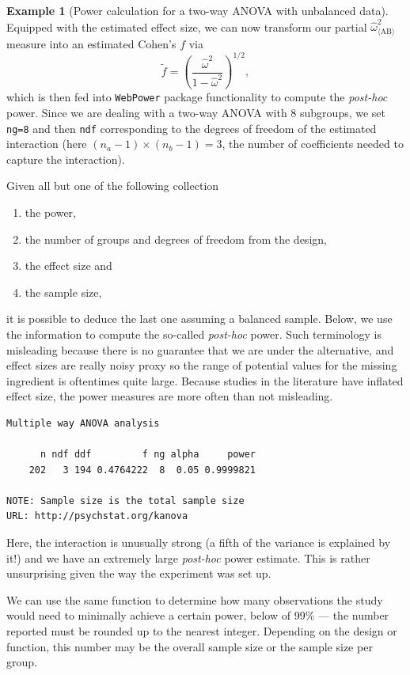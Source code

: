 \documentclass[
  11pt,
  letterpaper,
]{scrbook}
\providecommand{\tightlist}{%
  \setlength{\itemsep}{0pt}\setlength{\parskip}{0pt}}\usepackage{longtable,booktabs,array}
\theoremstyle{definition}
\theoremstyle{definition}
\newtheorem{example}{Example}[chapter]
\theoremstyle{remark}
\begin{document}
\begin{example}[Power calculation for a two-way ANOVA with unbalanced
data]
Equipped with the estimated effect size, we can now transform our
partial \(\widehat{\omega}^2_{\langle\text{AB}\rangle}\) measure into an
estimated Cohen's \(f\) via
\[\widetilde{f} = \left( \frac{\widehat{\omega}^2}{1-\widehat{\omega}^2}\right)^{1/2},\]
which is then fed into \texttt{WebPower} package functionality to
compute the \emph{post-hoc} power. Since we are dealing with a two-way
ANOVA with 8 subgroups, we set \texttt{ng=8} and then \texttt{ndf}
corresponding to the degrees of freedom of the estimated interaction
(here \((n_a-1)\times (n_b-1)=3\), the number of coefficients needed to
capture the interaction).

Given all but one of the following collection

\begin{enumerate}
\def\labelenumi{\arabic{enumi}.}
\tightlist
\item
  the power,
\item
  the number of groups and degrees of freedom from the design,
\item
  the effect size and
\item
  the sample size,
\end{enumerate}

it is possible to deduce the last one assuming a balanced sample. Below,
we use the information to compute the so-called \emph{post-hoc} power.
Such terminology is misleading because there is no guarantee that we are
under the alternative, and effect sizes are really noisy proxy so the
range of potential values for the missing ingredient is oftentimes quite
large. Because studies in the literature have inflated effect size, the
power measures are more often than not misleading.

\begin{verbatim}
Multiple way ANOVA analysis

      n ndf ddf         f ng alpha     power
    202   3 194 0.4764222  8  0.05 0.9999821

NOTE: Sample size is the total sample size
URL: http://psychstat.org/kanova
\end{verbatim}

Here, the interaction is unusually strong (a fifth of the variance is
explained by it!) and we have an extremely large \emph{post-hoc} power
estimate. This is rather unsurprising given the way the experiment was
set up.

We can use the same function to determine how many observations the
study would need to minimally achieve a certain power, below of 99\% ---
the number reported must be rounded up to the nearest integer. Depending
on the design or function, this number may be the overall sample size or
the sample size per group.


\end{example}
\end{document}
